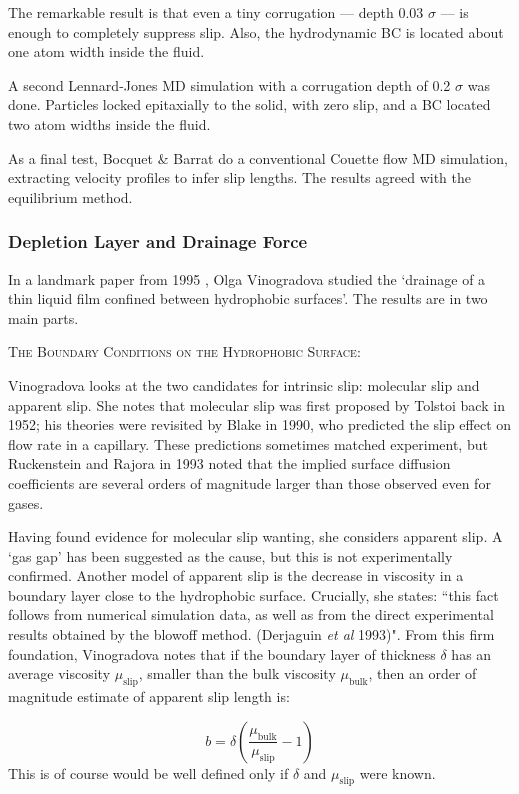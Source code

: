 \documentclass[12pt, a4paper, twoside, openright]{book}
\newcommand{\paper}[1]
         {\colorbox[gray]{0.8}{ \textsc{#1}}
         
         }
\begin{document}
The remarkable result is that even a tiny corrugation --- depth 0.03 $\sigma$ --- is enough to completely suppress slip. Also, the hydrodynamic BC is located about one atom width inside the fluid.

A second Lennard-Jones MD simulation with a corrugation depth of 0.2 $\sigma$ was done.  Particles locked epitaxially to the solid, with zero slip, and a BC located two atom widths inside the fluid.

As a final test, Bocquet \& Barrat do a conventional Couette flow MD simulation, extracting velocity profiles to infer slip lengths. The results agreed with the equilibrium method.


\clearpage
\subsubsection*{Depletion Layer and Drainage Force}
In a landmark paper from 1995 \cite{Vinogradova1995}, Olga Vinogradova studied the `drainage of a thin liquid film confined between hydrophobic surfaces'. The results are in two main parts.

\paper{The Boundary Conditions on the Hydrophobic Surface:}
Vinogradova looks at the two candidates for intrinsic slip: molecular slip and apparent slip.
She notes that molecular slip was first proposed by Tolstoi back in 1952; his theories were revisited by Blake in 1990, who predicted the slip effect on flow rate in a capillary.  These predictions sometimes matched experiment, but Ruckenstein and Rajora in 1993 noted that the implied surface diffusion coefficients are several orders of magnitude larger than those observed even for gases.

Having found evidence for molecular slip wanting, she considers apparent slip.  A `gas gap' has been suggested as the cause, but this is not experimentally confirmed. Another model of apparent slip is the decrease in viscosity in a boundary layer close to the hydrophobic surface. Crucially, she states: ``this fact follows from numerical simulation data, as well as from the direct experimental results obtained by the blowoff method. (Derjaguin \emph{et al} 1993)". From this firm foundation, Vinogradova notes that if the boundary layer of thickness $\delta$ has an average viscosity $\mu_{\mathrm{slip}}$, smaller than the bulk viscosity $\mu_{\mathrm{bulk}}$, then an order of magnitude estimate of apparent slip length is:

\begin{equation}
b= \delta \left( \frac{\mu_{\mathrm{bulk}}}{\mu_{\mathrm{slip}}} - 1 \right)
\end{equation}
This is of course would be well defined only if $\delta$ and $\mu_{\mathrm{slip}}$ were known.
\end{document}
